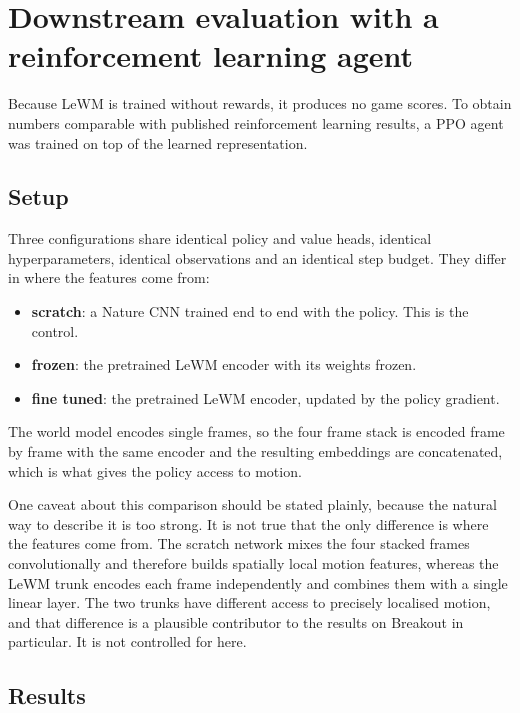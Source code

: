 \documentclass[11pt,a4paper]{article}
\begin{document}
\section{Downstream evaluation with a reinforcement learning agent}

Because LeWM is trained without rewards, it produces no game scores. To obtain
numbers comparable with published reinforcement learning results, a PPO agent was
trained on top of the learned representation.

\subsection{Setup}

Three configurations share identical policy and value heads, identical
hyperparameters, identical observations and an identical step budget. They differ
in where the features come from:

\begin{itemize}
\item \textbf{scratch}: a Nature CNN trained end to end with the policy. This is the control.
\item \textbf{frozen}: the pretrained LeWM encoder with its weights frozen.
\item \textbf{fine tuned}: the pretrained LeWM encoder, updated by the policy gradient.
\end{itemize}

The world model encodes single frames, so the four frame stack is encoded frame by
frame with the same encoder and the resulting embeddings are concatenated, which is
what gives the policy access to motion.

One caveat about this comparison should be stated plainly, because the natural way
to describe it is too strong. It is not true that the only difference is where the
features come from. The scratch network mixes the four stacked frames
convolutionally and therefore builds spatially local motion features, whereas the
LeWM trunk encodes each frame independently and combines them with a single linear
layer. The two trunks have different access to precisely localised motion, and
that difference is a plausible contributor to the results on Breakout in
particular. It is not controlled for here.

\subsection{Results}
\end{document}
